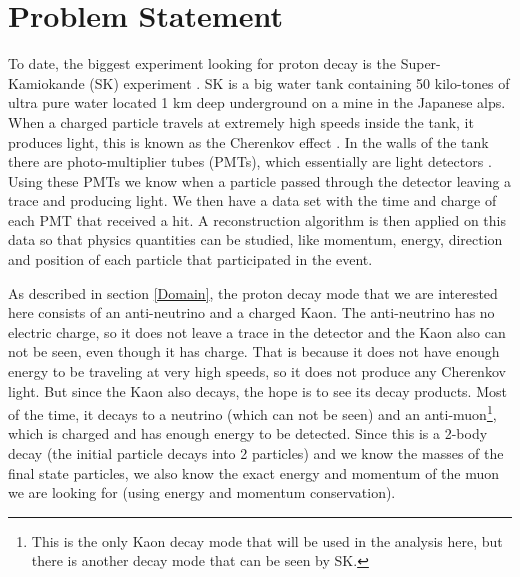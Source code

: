  
 \section{Problem Statement} \label{Problem}

To date, the biggest experiment looking for proton decay is the Super-Kamiokande (SK) experiment \cite{SK}. SK is a big water tank containing 50 kilo-tones of ultra pure water located 1 km deep underground on a mine in the Japanese alps. When a charged particle travels at extremely high speeds inside the tank, it produces light, this is known as the Cherenkov effect \cite{Cherenkov}. In the walls of the tank there are photo-multiplier tubes (PMTs), which essentially are light detectors \cite{PMT}. Using these PMTs we know when a particle passed through the detector leaving a trace and producing light. We then have a data set with the time and charge of each PMT that received a hit. A reconstruction algorithm is then applied on this data so that physics quantities can be studied, like momentum, energy, direction and position of each particle that participated in the event.

As described in section \ref{Domain}, the proton decay mode that we are interested here consists of an anti-neutrino and a charged Kaon. The anti-neutrino has no electric charge, so it does not leave a trace in the detector and the Kaon also can not be seen, even though it has charge. That is because it does not have enough energy to be traveling at very high speeds, so it does not produce any Cherenkov light. But since the Kaon also decays, the hope is to see its decay products. Most of the time, it decays to a neutrino (which can not be seen) and an anti-muon\footnote{This is the only Kaon decay mode that will be used in the analysis here, but there is another decay mode that can be seen by SK.}, which is charged and has enough energy to be detected. Since this is a 2-body decay (the initial particle decays into 2 particles) and we know the masses of the final state particles, we also know the exact energy and momentum of the muon we are looking for (using energy and momentum conservation).

